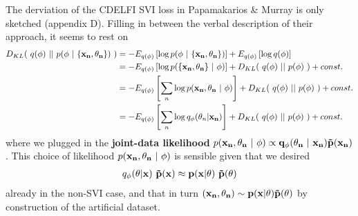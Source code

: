 \documentclass[10pt,english]{article}
\begin{document}
The derviation of the CDELFI SVI loss in Papamakarios \& Murray is only sketched (appendix D). 
Filling in between the verbal description of their approach, it seems to rest on 
\begin{align}
D_{KL}( \ q(\phi) \ || \ p(\phi \ | \ \{\bf{x}_n, \theta_n\}) \ ) &= - E_{q(\phi)}\left[ \log p(\phi \ | \ \{\bf{x}_n, \theta_n\}) \right]  + E_{q(\phi)}\left[ \log q(\phi) \right] \nonumber \\
&= - E_{q(\phi)}\left[ \log p( \{\bf{x}_n, \theta_n\} \ | \ \phi) \right]  + D_{KL}( \ q(\phi) \ || \ p(\phi) \ )  + const. \nonumber \\
&= - E_{q(\phi)}\left[ \sum_n \log p( \bf{x}_n, \theta_n \ | \ \phi) \right]  + D_{KL}( \ q(\phi) \ || \ p(\phi) \ )  + const. \nonumber \\
&= - E_{q(\phi)}\left[ \sum_n \log q_\phi( \theta_n | \bf{x}_n) \right]  + D_{KL}( \ q(\phi) \ || \ p(\phi) \ )  + const. \nonumber
\end{align}
where we plugged in the \textbf{joint-data likelihood} $p( \bf{x}_n, \theta_n \ | \ \phi) \propto q_\phi(\theta_n \ | \ \bf{x}_n) \tilde{p}(\bf{x}_n)$. 
This choice of likelihood $p( \bf{x}_n, \theta_n \ | \ \phi)$ is sensible given that we desired
\begin{align}
q_\phi(\theta | \bf{x}) \ \tilde{p}(\bf{x}) \approx p(x |\theta) \ \tilde{p}(\theta) \nonumber
\end{align}
already in the non-SVI case, and that in turn $(\bf{x}_n, \theta_n) \sim p(x|\theta)\tilde{p}(\theta)$ by construction of the artificial dataset.
\end{document}
